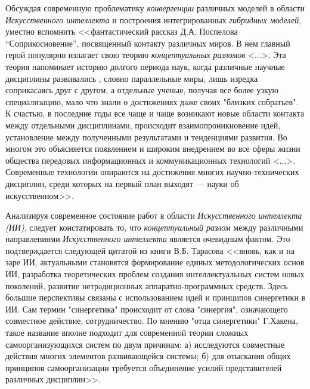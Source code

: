 Обсуждая современную проблематику \textit{конвергенции} различных моделей в области \textit{Искусственного интеллекта} и построения интегрированных \textit{гибридных моделей}, уместно вспомнить <<фантастический рассказ Д.А. Поспелова ``Соприкосновение'', посвященный контакту различных миров. В нем главный герой популярно излагает свою теорию \textit{концептуальных разломов} <...>. Эта теория напоминает историю долгого периода  наук, когда различные научные дисциплины развивались , словно параллельные миры, лишь изредка соприкасаясь друг с другом, а отдельные ученые, получая все более узкую специализацию, мало что знали о достижениях даже своих "близких собратьев". К счастью, в последние годы все чаще и чаще возникают новые области контакта между отдельными дисциплинами, происходит взаимопроникновение идей, установление  между полученными результатами и тенденциями развития. Во многом это объясняется появлением и широким внедрением во все сферы жизни общества передовых информационных и коммуникационных технологий <...>. Современные технологии опираются на достижения многих научно-технических дисциплин, среди которых на первый план выходят  --- науки об искусственном>>.
\begin{SCn}
\end{SCn}

Анализируя современное состояние работ в области \textit{Искусственного интеллекта (ИИ)}, следует констатировать то, что \textit{концептуальный разлом} между различными направлениями \textit{Искусственного интеллекта} является очевидным фактом. Это подтверждается следующей цитатой из книги В.Б. Тарасова  <<вновь, как и на заре ИИ, актуальными становятся формирование единых методологических основ ИИ, разработка теоретических проблем создания интеллектуальных систем новых поколений, развитие нетрадиционных аппаратно-программных средств. Здесь большие перспективы связаны с использованием идей и принципов синергетики в ИИ. Сам термин "синергетика"{} происходит от слова "синергия"{}, означающего совместное действие, сотрудничество. По мнению "отца синергетики"{} Г.Хакена, такое название вполне подходит для современной теории сложных самоорганизующихся систем по двум причинам: а) исследуются совместные действия многих элементов развивающейся системы; б) для отыскания общих принципов самоорганизации требуется объединение усилий представителей различных дисциплин>>.
\begin{SCn}
\end{SCn}

